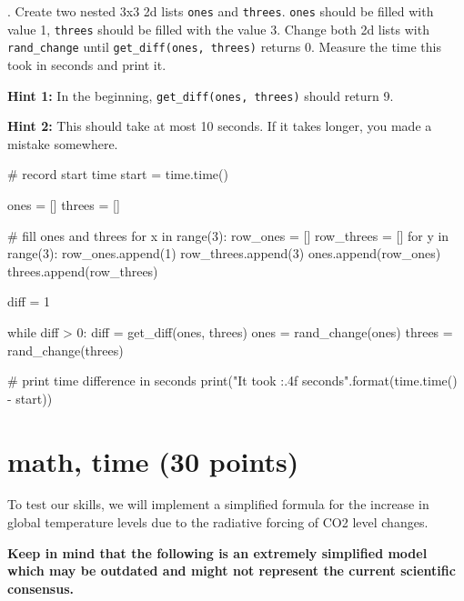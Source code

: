 . Create two nested 3x3 2d lists \texttt{ones} and \texttt{threes}. \texttt{ones} should be filled with value 1, \texttt{threes} should be filled with the value 3. Change both 2d lists with \texttt{rand\_change} until \texttt{get\_diff(ones, threes)} returns 0. Measure the time this took in seconds and print it.

\vspace{1em}

\noindent \textbf{Hint 1:} In the beginning, \texttt{get\_diff(ones, threes)} should return 9.

\noindent \textbf{Hint 2:} This should take at most 10 seconds. If it takes longer, you made a mistake somewhere.

\vspace{1em}

\begin{solution}

\begin{pythoncode}

# record start time
start = time.time()

ones = []
threes = []

# fill ones and threes
for x in range(3):
    row_ones = []
    row_threes = []
    for y in range(3):
        row_ones.append(1)
        row_threes.append(3)
    ones.append(row_ones)
    threes.append(row_threes)

diff = 1

while diff > 0:
    diff = get_diff(ones, threes)
    ones = rand_change(ones)
    threes = rand_change(threes)

# print time difference in seconds
print("It took {:.4f} seconds".format(time.time() - start))

\end{pythoncode}

\end{solution}

\section{math, time (30 points)}

To test our skills, we will implement a simplified formula for the increase in global temperature levels due to the radiative forcing of CO2 level changes.

\vspace{1em}

\noindent \textbf{Keep in mind that the following is an extremely simplified model which may be outdated and might not represent the current scientific consensus.}

